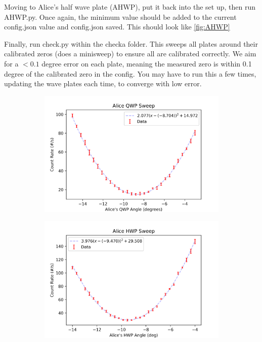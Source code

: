 \documentclass{paper}[11pt]
\begin{document}
Moving to Alice's half wave plate (AHWP), put it back into the set up, then run AHWP.py. Once again, the minimum value should be added to the current config.json value and config.json saved. This should look like \ref{fig:AHWP}

Finally, run check.py within the checka folder. This sweeps all plates around their calibrated zeros (does a minisweep) to ensure all are calibrated correctly. We aim for a $< 0.1$ degree error on each plate, meaning the measured zero is within 0.1 degree of the calibrated zero in the config. You may have to run this a few times, updating the wave plates each time, to converge with low error. 
\begin{figure}[t]
    \centering
    \begin{subfigure}{0.32\linewidth}
        \centering
        \includegraphics[width=1\linewidth]{figs/AQWP_sweep2.png}
        \caption{}
        \label{fig:AQWP}
    \end{subfigure}
    \begin{subfigure}{0.32\linewidth}
        \centering
        \includegraphics[width=1\linewidth]{figs/AHWP_sweep1.png}

\end{subfigure}
\end{figure}
\end{document}
